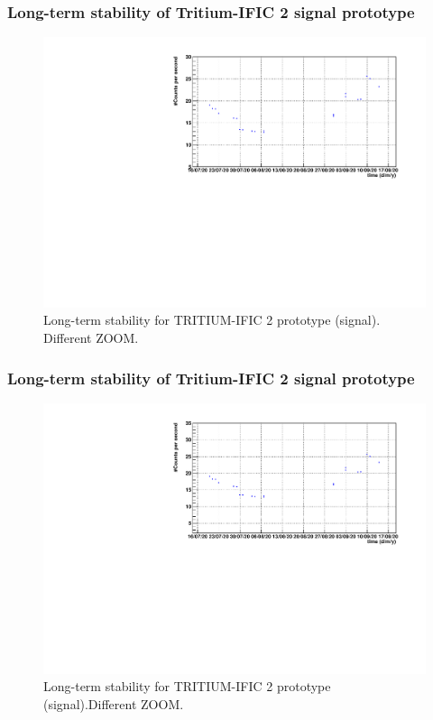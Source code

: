 \documentclass{beamer}
\begin{document}
\begin{frame}
\frametitle{Long-term stability of Tritium-IFIC 2 signal prototype}

\begin{figure}[hbtp]
\centering
\includegraphics[scale=0.6]{Imagenes/3Long-term_Stability/Monitorizacion_senyal_azul_ZOOM.pdf}
\caption{Long-term stability for TRITIUM-IFIC 2 prototype (signal). Different ZOOM.}
\end{figure}

\end{frame}

\begin{frame}
\frametitle{Long-term stability of Tritium-IFIC 2 signal prototype}

\begin{figure}[hbtp]
\centering
\includegraphics[scale=0.6]{Imagenes/3Long-term_Stability/Monitorizacion_senyal_azul_ZOOM2.pdf}
\caption{Long-term stability for TRITIUM-IFIC 2 prototype (signal).Different ZOOM.}
\end{figure}

\end{frame}
\end{document}
